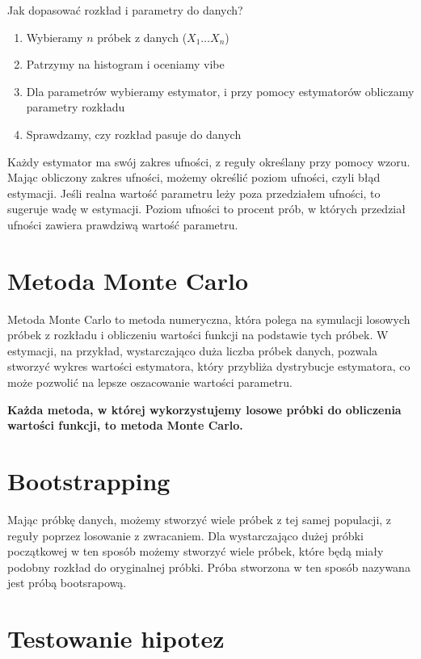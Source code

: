 \documentclass{../notatki}
\begin{document}
Jak dopasować rozkład i parametry do danych?

\begin{enumerate}
  \item Wybieramy $n$ próbek z danych ($X_1 \dots X_n$)
  \item Patrzymy na histogram i oceniamy vibe
  \item Dla parametrów wybieramy estymator, i przy pomocy estymatorów
    obliczamy parametry rozkładu
  \item Sprawdzamy, czy rozkład pasuje do danych
\end{enumerate}

Każdy estymator ma swój zakres ufności, z reguły określany przy pomocy wzoru.
Mając obliczony zakres ufności, możemy określić poziom ufności, czyli błąd
estymacji. Jeśli realna wartość parametru leży poza przedziałem ufności, to
sugeruje wadę w estymacji. Poziom ufności to procent prób, w których przedział
ufności zawiera prawdziwą wartość parametru.

\section{Metoda Monte Carlo}

Metoda Monte Carlo to metoda numeryczna, która polega na symulacji losowych
próbek z rozkładu i obliczeniu wartości funkcji na podstawie tych próbek. W
estymacji, na przykład, wystarczająco duża liczba próbek danych,
pozwala stworzyć
wykres wartości estymatora, który przybliża dystrybucje estymatora, co może
pozwolić na lepsze oszacowanie wartości parametru.

\textbf{Każda metoda, w której wykorzystujemy losowe próbki do
obliczenia wartości funkcji, to metoda Monte Carlo.}

\section{Bootstrapping}

Mając próbkę danych, możemy stworzyć wiele próbek z tej samej
populacji, z reguły poprzez losowanie z zwracaniem. Dla wystarczająco dużej
próbki początkowej w ten sposób możemy stworzyć wiele próbek, które
będą miały podobny rozkład do oryginalnej próbki. Próba stworzona w ten sposób
nazywana jest próbą bootsrapową.

\section{Testowanie hipotez}
\end{document}
